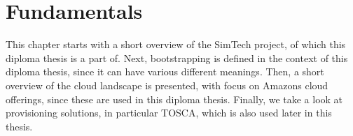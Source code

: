 \chapter{Fundamentals}

This chapter starts with a short overview of the SimTech project, of which this diploma thesis is a part of.
Next, bootstrapping is defined in the context of this diploma thesis, since it can have various different meanings.
Then, a short overview of the cloud landscape is presented, with focus on Amazons cloud offerings, since these are used in this diploma thesis.
Finally, we take a look at provisioning solutions, in particular TOSCA, which is also used later in this thesis.





